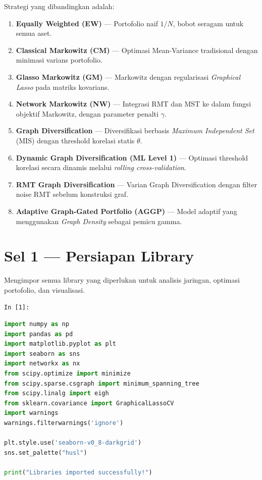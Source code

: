\documentclass[12pt,a4paper]{article}
\newcommand{\cellIn}[1]{%
  \begin{tcolorbox}[cellheader]
    \texttt{In [#1]:}
  \end{tcolorbox}\vspace{-6pt}%
}
\begin{document}
Strategi yang dibandingkan adalah:

\begin{enumerate}[leftmargin=2cm, label=\textbf{\arabic*.}]
  \item \textbf{Equally Weighted (EW)} --- Portofolio naif $1/N$, bobot seragam
        untuk semua aset.
  \item \textbf{Classical Markowitz (CM)} --- Optimasi Mean-Variance tradisional
        dengan minimasi varians portofolio.
  \item \textbf{Glasso Markowitz (GM)} --- Markowitz dengan regularisasi
        \emph{Graphical Lasso} pada matriks kovarians.
  \item \textbf{Network Markowitz (NW)} --- Integrasi RMT dan MST ke dalam
        fungsi objektif Markowitz, dengan parameter penalti $\gamma$.
  \item \textbf{Graph Diversification} --- Diversifikasi berbasis
        \emph{Maximum Independent Set} (MIS) dengan threshold korelasi statis
        $\theta$.
  \item \textbf{Dynamic Graph Diversification (ML Level 1)} --- Optimasi
        threshold korelasi secara dinamis melalui \emph{rolling cross-validation}.
  \item \textbf{RMT Graph Diversification} --- Varian Graph Diversification
        dengan filter noise RMT sebelum konstruksi graf.
  \item \textbf{Adaptive Graph-Gated Portfolio (AGGP)} --- Model adaptif yang
        menggunakan \emph{Graph Density} sebagai pemicu gamma.
\end{enumerate}

\section{Sel 1 --- Persiapan Library}

Mengimpor semua library yang diperlukan untuk analisis jaringan, optimasi
portofolio, dan visualisasi.

\cellIn{1}
\begin{tcolorbox}[codebox]
\begin{lstlisting}[language=Python, numbers=none]
import numpy as np
import pandas as pd
import matplotlib.pyplot as plt
import seaborn as sns
import networkx as nx
from scipy.optimize import minimize
from scipy.sparse.csgraph import minimum_spanning_tree
from scipy.linalg import eigh
from sklearn.covariance import GraphicalLassoCV
import warnings
warnings.filterwarnings('ignore')

plt.style.use('seaborn-v0_8-darkgrid')
sns.set_palette("husl")

print("Libraries imported successfully!")
\end{lstlisting}
\end{tcolorbox}
\end{document}
